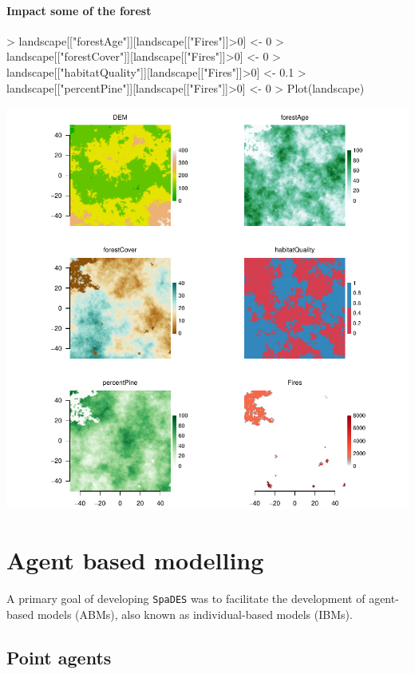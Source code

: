 \documentclass{article}
\begin{document}
\paragraph{Impact some of the forest}
\begin{Schunk}
\begin{Sinput}
> landscape[["forestAge"]][landscape[["Fires"]]>0] <- 0
> landscape[["forestCover"]][landscape[["Fires"]]>0] <- 0
> landscape[["habitatQuality"]][landscape[["Fires"]]>0] <- 0.1
> landscape[["percentPine"]][landscape[["Fires"]]>0] <- 0
> Plot(landscape)
\end{Sinput}
\end{Schunk}
\includegraphics{introduction-fire-impacts-maps}

\newpage

\section{Agent based modelling}
A primary goal of developing \texttt{SpaDES} was to facilitate the development of agent-based models (ABMs), also known as individual-based models (IBMs).

\subsection{Point agents}
\end{document}
